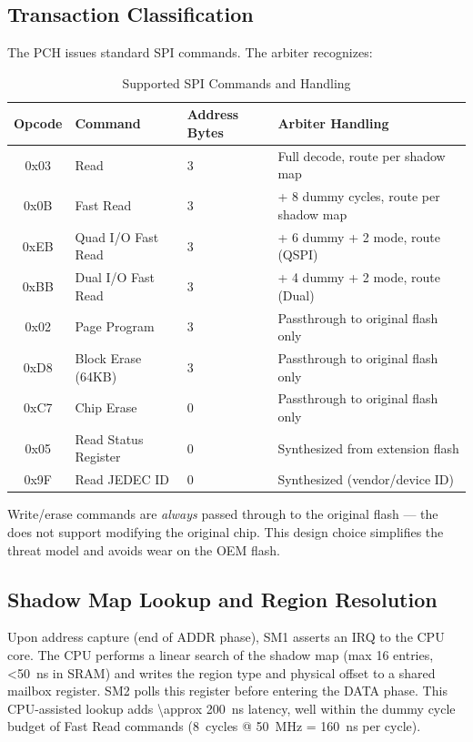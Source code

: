 \subsection{Transaction Classification}
The \ac{PCH} issues standard \ac{SPI} commands. The arbiter recognizes:
\begin{table}[h]
\centering
\caption{Supported \ac{SPI} Commands and Handling}
\label{tab:spi_commands}
\begin{tabular}{@{}clll@{}}
\toprule
\textbf{Opcode} & \textbf{Command} & \textbf{Address Bytes} & \textbf{Arbiter Handling} \\
\midrule
0x03  & Read                      & 3 & Full decode, route per shadow map \\
0x0B  & Fast Read                 & 3 & + 8 dummy cycles, route per shadow map \\
0xEB  & Quad I/O Fast Read        & 3 & + 6 dummy + 2 mode, route (QSPI) \\
0xBB  & Dual I/O Fast Read        & 3 & + 4 dummy + 2 mode, route (Dual) \\
0x02  & Page Program              & 3 & Passthrough to original flash only \\
0xD8  & Block Erase (64KB)        & 3 & Passthrough to original flash only \\
0xC7  & Chip Erase                & 0 & Passthrough to original flash only \\
0x05  & Read Status Register      & 0 & Synthesized from extension flash \\
0x9F  & Read JEDEC ID             & 0 & Synthesized (vendor/device ID) \\
\bottomrule
\end{tabular}
\end{table}

Write/erase commands are \textit{always} passed through to the original flash — the \vbfc does not support modifying the original chip. This design choice simplifies the threat model and avoids wear on the OEM flash.

\subsection{Shadow Map Lookup and Region Resolution}
Upon address capture (end of ADDR phase), SM1 asserts an IRQ to the CPU core. The CPU performs a linear search of the shadow map (max 16 entries, \SI{<50}{ns} in \ac{SRAM}) and writes the region type and physical offset to a shared mailbox register. SM2 polls this register before entering the DATA phase. This CPU-assisted lookup adds \SI{\approx 200}{ns} latency, well within the dummy cycle budget of Fast Read commands (\SI{8}{cycles} @ \SI{50}{MHz} = \SI{160}{ns} per cycle).

